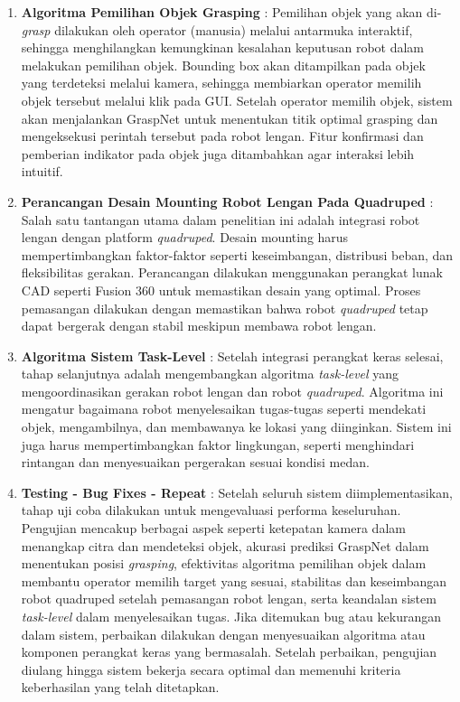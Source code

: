 \begin{enumerate}
  \item \textbf{Algoritma Pemilihan Objek Grasping} : Pemilihan objek yang akan di-\emph{grasp} dilakukan
  oleh operator (manusia) melalui antarmuka interaktif, sehingga menghilangkan kemungkinan kesalahan
  keputusan robot dalam melakukan pemilihan objek. Bounding box akan ditampilkan pada objek yang terdeteksi
  melalui kamera, sehingga membiarkan operator memilih objek tersebut melalui klik pada GUI. Setelah operator
  memilih objek, sistem akan menjalankan GraspNet untuk menentukan titik optimal grasping dan
  mengeksekusi perintah tersebut pada robot lengan. Fitur konfirmasi dan pemberian indikator pada objek
  juga ditambahkan agar interaksi lebih intuitif.

  \item \textbf{Perancangan Desain Mounting Robot Lengan Pada Quadruped} : Salah satu tantangan utama dalam penelitian
  ini adalah integrasi robot lengan dengan platform \emph{quadruped}. Desain mounting harus mempertimbangkan faktor-faktor
  seperti keseimbangan, distribusi beban, dan fleksibilitas gerakan. Perancangan dilakukan menggunakan perangkat lunak CAD
  seperti Fusion 360 untuk memastikan desain yang optimal. Proses pemasangan dilakukan dengan memastikan bahwa robot
  \emph{quadruped} tetap dapat bergerak dengan stabil meskipun membawa robot lengan.

  \item \textbf{Algoritma Sistem Task-Level} : Setelah integrasi perangkat keras selesai, tahap selanjutnya adalah
  mengembangkan algoritma \emph{task-level} yang mengoordinasikan gerakan robot lengan dan robot \emph{quadruped}.
  Algoritma ini mengatur bagaimana robot menyelesaikan tugas-tugas seperti mendekati objek, mengambilnya, dan
  membawanya ke lokasi yang diinginkan. Sistem ini juga harus mempertimbangkan faktor lingkungan, seperti menghindari
  rintangan dan menyesuaikan pergerakan sesuai kondisi medan.

  \item \textbf{Testing - Bug Fixes - Repeat} : Setelah seluruh sistem diimplementasikan, tahap uji coba dilakukan
  untuk mengevaluasi performa keseluruhan. Pengujian mencakup berbagai aspek seperti ketepatan kamera dalam menangkap
  citra dan mendeteksi objek, akurasi prediksi GraspNet dalam menentukan posisi \emph{grasping}, efektivitas algoritma
  pemilihan objek dalam membantu operator memilih target yang sesuai, stabilitas dan keseimbangan robot quadruped setelah
  pemasangan robot lengan, serta keandalan sistem \emph{task-level} dalam menyelesaikan tugas. Jika ditemukan bug atau
  kekurangan dalam sistem, perbaikan dilakukan dengan menyesuaikan algoritma atau komponen perangkat keras yang bermasalah.
  Setelah perbaikan, pengujian diulang hingga sistem bekerja secara optimal dan memenuhi kriteria keberhasilan yang telah ditetapkan.
  
\end{enumerate}